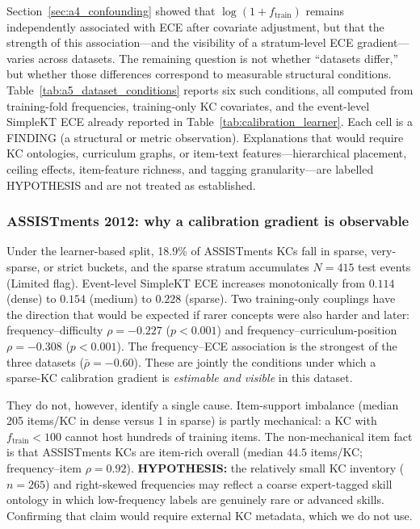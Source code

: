 Section~\ref{sec:a4_confounding} showed that $\log(1+f_{\mathrm{train}})$ remains independently associated with ECE after covariate adjustment, but that the strength of this association---and the visibility of a stratum-level ECE gradient---varies across datasets.
The remaining question is not whether ``datasets differ,'' but whether those differences correspond to measurable structural conditions.
Table~\ref{tab:a5_dataset_conditions} reports six such conditions, all computed from training-fold frequencies, training-only KC covariates, and the event-level SimpleKT ECE already reported in Table~\ref{tab:calibration_learner}.
Each cell is a FINDING (a structural or metric observation).
Explanations that would require KC ontologies, curriculum graphs, or item-text features---hierarchical placement, ceiling effects, item-feature richness, and tagging granularity---are labelled HYPOTHESIS and are not treated as established.

\subsubsection*{ASSISTments 2012: why a calibration gradient is observable}
Under the learner-based split, 18.9\% of ASSISTments KCs fall in sparse, very-sparse, or strict buckets, and the sparse stratum accumulates $N=415$ test events (Limited flag).
Event-level SimpleKT ECE increases monotonically from $0.114$ (dense) to $0.154$ (medium) to $0.228$ (sparse).
Two training-only couplings have the direction that would be expected if rarer concepts were also harder and later: frequency--difficulty $\rho=-0.227$ ($p<0.001$) and frequency--curriculum-position $\rho=-0.308$ ($p<0.001$).
The frequency--ECE association is the strongest of the three datasets ($\bar{\rho}=-0.60$).
These are jointly the conditions under which a sparse-KC calibration gradient is \emph{estimable and visible} in this dataset.

They do not, however, identify a single cause.
Item-support imbalance (median 205 items/KC in dense versus 1 in sparse) is partly mechanical: a KC with $f_{\mathrm{train}}<100$ cannot host hundreds of training items.
The non-mechanical item fact is that ASSISTments KCs are item-rich overall (median $44.5$ items/KC; frequency--item $\rho=0.92$).
\textbf{HYPOTHESIS:} the relatively small KC inventory ($n=265$) and right-skewed frequencies may reflect a coarse expert-tagged skill ontology in which low-frequency labels are genuinely rare or advanced skills.
Confirming that claim would require external KC metadata, which we do not use.


